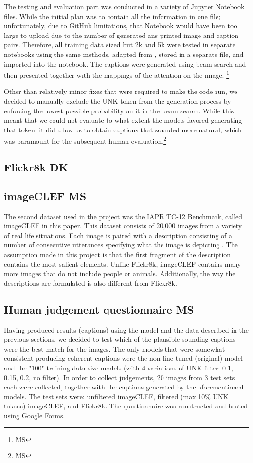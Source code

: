 \documentclass[11pt]{article}
\begin{document}
The testing and evaluation part was conducted in a variety of Jupyter Notebook files. While the initial plan was to contain all the information in one file; unfortunately, due to GitHub limitations, that Notebook would have been too large to upload due to the number of generated ans printed image and caption pairs. Therefore, all training data sized but 2k and 5k were tested in separate notebooks using the same methods, adapted from \cite{ilinykh}, stored in a separate file, and imported into the notebook. The captions were generated using beam search and then presented together with the mappings of the attention on the image. \footnote{MS}

Other than relatively minor fixes that were required to make the code run, we decided to manually exclude the UNK token from the generation process by enforcing the lowest possible probability on it in the beam search. While this meant that we could not evaluate to what extent the models favored generating that token, it did allow us to obtain captions that sounded more natural, which was paramount for the subsequent human evaluation.\footnote{MS} 

\subsection{Flickr8k \textbf{DK}}
\subsection{imageCLEF \textbf{MS}}

The second dataset used in the project was the IAPR TC-12 Benchmark, called imageCLEF in this paper. This dataset consists of 20,000 images from a variety of real life situations. Each image is paired with a description consisting of a number of consecutive utterances specifying what the image is depicting \cite{imageclef}. The assumption made in this project is that the first fragment of the description contains the most salient elements. Unlike Flickr8k, imageCLEF contains many more images that do not include people or animals. Additionally, the way the descriptions are formulated is also different from Flickr8k.

\subsection{Human judgement questionnaire \textbf{MS}}

Having produced results (captions) using the model and the data described in the previous sections, we decided to test which of the plausible-sounding captions were the best match for the images. The only models that were somewhat consistent producing coherent captions were the non-fine-tuned (original) model and the "100" training data size models (with 4 variations of UNK filter: 0.1, 0.15, 0.2, no filter). In order to collect judgements, 20 images from 3 test sets each were collected, together with the captions generated by the aforementioned models. The test sets were: unfiltered imageCLEF, filtered (max 10\% UNK tokens) imageCLEF, and Flickr8k. The questionnaire was constructed and hosted using Google Forms.
\end{document}
